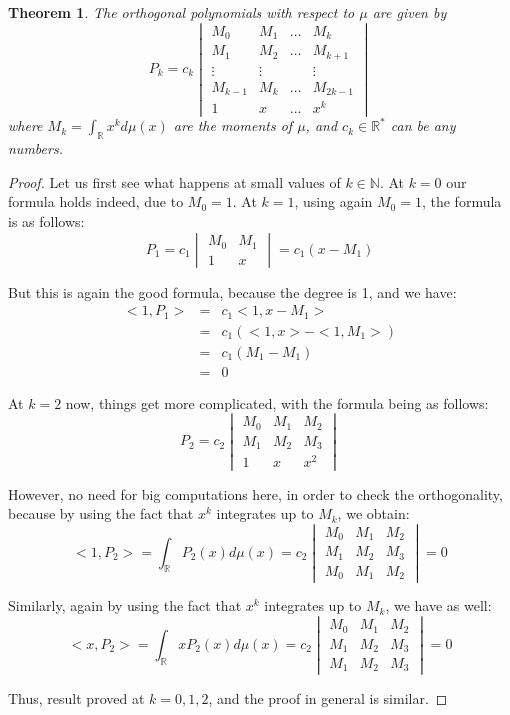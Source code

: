 \documentclass[12pt]{amsbook}
\newtheorem{theorem}{Theorem}[chapter]
\begin{document}
\begin{theorem}
The orthogonal polynomials with respect to $\mu$ are given by
$$P_k=c_k\begin{vmatrix}
M_0&M_1&\ldots&M_k\\
M_1&M_2&\ldots&M_{k+1}\\
\vdots&\vdots&&\vdots\\
M_{k-1}&M_k&\ldots&M_{2k-1}\\
1&x&\ldots&x^k
\end{vmatrix}$$
where $M_k=\int_\mathbb Rx^kd\mu(x)$ are the moments of $\mu$, and $c_k\in\mathbb R^*$ can be any numbers.
\end{theorem}

\begin{proof}
Let us first see what happens at small values of $k\in\mathbb N$. At $k=0$ our formula holds indeed, due to $M_0=1$. At $k=1$, using again $M_0=1$, the formula is as follows:
$$P_1=c_1\begin{vmatrix}M_0&M_1\\ 1&x\end{vmatrix}=c_1(x-M_1)$$

But this is again the good formula, because the degree is 1, and we have:
\begin{eqnarray*}
<1,P_1>
&=&c_1<1,x-M_1>\\
&=&c_1(<1,x>-<1,M_1>)\\
&=&c_1(M_1-M_1)\\
&=&0
\end{eqnarray*}

At $k=2$ now, things get more complicated, with the formula being as follows:
$$P_2=c_2\begin{vmatrix}
M_0&M_1&M_2\\
M_1&M_2&M_3\\
1&x&x^2
\end{vmatrix}$$

However, no need for big computations here, in order to check the orthogonality, because by using the fact that $x^k$ integrates up to $M_k$, we obtain:
$$<1,P_2>=\int_\mathbb RP_2(x)d\mu(x)=c_2\begin{vmatrix}
M_0&M_1&M_2\\
M_1&M_2&M_3\\
M_0&M_1&M_2
\end{vmatrix}=0$$

Similarly, again by using the fact that $x^k$ integrates up to $M_k$, we have as well:
$$<x,P_2>=\int_\mathbb RxP_2(x)d\mu(x)=c_2\begin{vmatrix}
M_0&M_1&M_2\\
M_1&M_2&M_3\\
M_1&M_2&M_3
\end{vmatrix}=0$$

Thus, result proved at $k=0,1,2$, and the proof in general is similar.
\end{proof}
\end{document}
